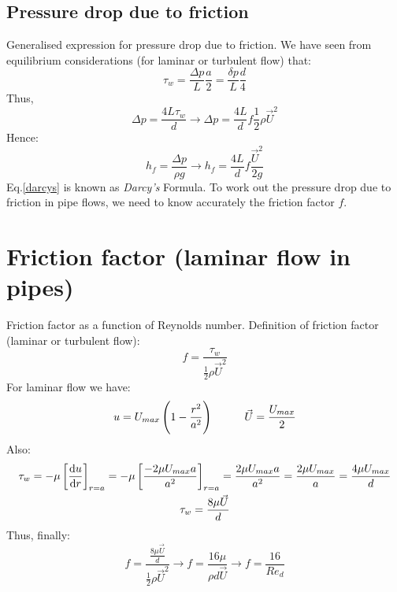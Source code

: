 \documentclass[class=report, crop=false, 12pt,a4paper]{standalone}
\begin{document}
\subsection{Pressure drop due to friction}
Generalised expression for pressure drop due to friction. We have seen from equilibrium considerations (for laminar or turbulent flow) that: 
\begin{equation}
  \tau_w = \frac{\Delta p}{L} \frac{a}{2} = \frac{\delta p}{L} \frac{d}{4}
\end{equation}
Thus,
\begin{equation}
  \Delta p = \frac{4L\tau_w}{d}\rightarrow \Delta p =\frac{4L}{d} f \frac{1}{2} \rho \vec{U}^2
\end{equation}
Hence:
\begin{equation}
  h_f = \frac{\Delta p}{\rho g} \rightarrow h_f = \frac{4L}{d} f \frac{\vec{U}^2}{2g} \label{darcys}
\end{equation}
Eq.\ref{darcys} is known as \textit{Darcy's} Formula. To work out the pressure drop due to friction in pipe flows, we need to know accurately the friction factor $f$.
\section{Friction factor (laminar flow in pipes)}
Friction factor as a function of Reynolds number. Definition of friction factor (laminar or turbulent flow):
\begin{equation}
  f = \frac{\tau_w}{\frac{1}{2}\rho \vec{U}^2}
\end{equation}
For laminar flow we have:
\begin{equation}
  u = U_{max} \left(1-\frac{r^2}{a^2}\right) \makebox[1cm]{} \vec{U} = \frac{U_{max}}{2}
\end{equation}
Also:
\begin{gather}
  \tau_w = - \mu \left[\frac{\dif u}{\dif r}\right]_{r=a} = -\mu \left[\frac{-2\mu U_{max}a}{a^2}\right]_{r=a} = \frac{2\mu U_{max} a}{a^2} = \frac{2\mu U_{max}}{a} = \frac{4\mu U_{max}}{d}\\
  \tau_w = \frac{8\mu\vec{U}}{d}
\end{gather}
Thus, finally:
\begin{equation}
  f= \frac{\frac{8\mu\vec{U}}{d}}{\frac{1}{2}\rho \vec{U}^2} \rightarrow f = \frac{16\mu}{\rho d \vec{U}} \rightarrow f = \frac{16}{Re_d}
\end{equation}
\end{document}
